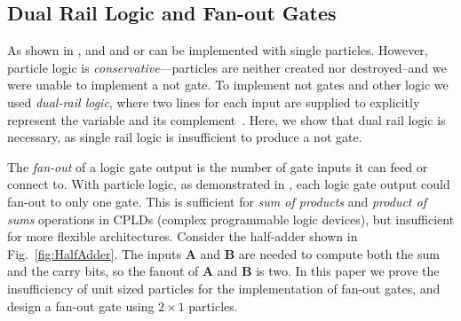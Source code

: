 \documentclass[letterpaper, 10 pt, conference]{ieeeconf}
\begin{document}
 \subsection{Dual Rail Logic and Fan-out Gates}

  As shown in \cite{Becker2013f}, {\sc and} and {\sc or} can be implemented with single particles.  However, particle logic is \emph{conservative}---particles are neither created nor destroyed--and we were unable to implement a {\sc not} gate. To implement {\sc not} gates and other logic we used \emph{dual-rail logic}, where two lines for each input are supplied to explicitly represent the variable and its complement~\cite{Becker2014a}. Here, we show that dual rail logic is necessary, as single rail logic is insufficient to produce a {\sc not} gate. 

  The \emph{fan-out} of a logic gate output is the number of gate inputs it can feed or connect to.  With particle logic, as demonstrated in  \cite{Becker2014}, each logic gate output could fan-out to only one gate.  This is sufficient for \emph{sum of products} and \emph{product of sums}  operations in CPLDs (complex programmable logic devices), but insufficient for more flexible architectures.
%  
    Consider the half-adder shown in Fig.~\ref{fig:HalfAdder}.  The inputs $\mathbf{A}$ and  $\mathbf{B}$ are needed to compute both the {\sc sum} and the {\sc carry} bits, so the fanout of $\mathbf{A}$ and  $\mathbf{B}$ is two. In this paper we prove the insufficiency of unit sized particles for the implementation of fan-out gates, and design a fan-out gate using $2\times 1$ particles. 
  
  



\end{document}
